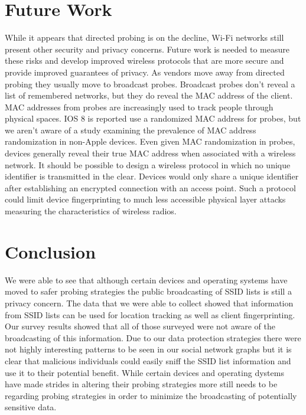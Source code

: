 \documentclass[letterpaper,twocolumn,10pt]{article}
\begin{document}
\section{Future Work}
While it appears that directed probing is on the decline, Wi-Fi networks still present other security and privacy concerns. Future work is needed to measure these risks and develop improved wireless protocols that are more secure and provide improved guarantees of privacy. As vendors move away from directed probing they usually move to broadcast probes. Broadcast probes don't reveal a list of remembered networks, but they do reveal the MAC address of the client. MAC addresses from probes are increasingly used to track people through physical spaces. IOS 8 is reported use a randomized MAC address for probes, but we aren't aware of a study examining the prevalence of MAC address randomization in non-Apple devices. Even given MAC randomization in probes, devices generally reveal their true MAC address when associated with a wireless network. It should be possible to design a wireless protocol in which no unique identifier is transmitted in the clear. Devices would only share a unique identifier after establishing an encrypted connection with an access point. Such a protocol could limit device fingerprinting to much less accessible physical layer attacks measuring the characteristics of wireless radios.

\section{Conclusion}

We were able to see that although certain devices and operating systems have moved 
to safer probing strategies the public broadcasting of SSID lists is still a privacy concern.  
The data that we were able to collect showed that information from SSID lists can be used for 
location tracking as well as client fingerprinting. Our survey results showed that all of those 
surveyed were not aware of the broadcasting of this information. Due to our
data protection strategies there were not highly interesting patterns to be seen in our social network 
graphs but it is clear that malicious individuals could easily sniff the SSID list information and use 
it to their potential benefit. While certain devices and operating dystems have made strides in 
altering their probing strategies more still needs to be regarding probing strategies in order to 
minimize the broadcasting of potentially sensitive data. 





\end{document}
